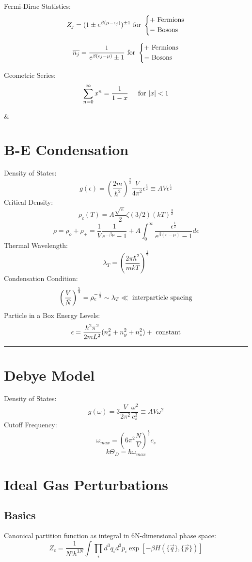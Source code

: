 \documentclass[table,cmyk]{article}
\begin{document}
\begin{longtable}
Fermi-Dirac Statistics:
\[Z_{j} = (1\pm e^{\beta(\mu - \epsilon_{j})})^{\pm1} \textmd{ for }
\begin{dcases}
	+ \textmd{ Fermions}\\
	- \textmd{ Bosons}
\end{dcases}
\]

\[ \overline{n_{j}} = \frac{1}{e^{\beta(\epsilon_{j} - \mu)} \pm 1} \textmd{ for }
\begin{dcases}
	+ \textmd{ Fermions}\\
	- \textmd{ Bosons}
\end{dcases}\]

Geometric Series:
\[\sum_{n=0}^{\infty} x^n = \frac{1}{1-x} \textmd{\hspace{0.5cm}for } |x| < 1\]

&
\section*{B-E Condensation}
Density of States:
\[g(\epsilon) = \left(\frac{2m}{\hbar^2}\right)^{\frac{2}{3}} \frac{V}{4\pi^2}\epsilon^{\frac{1}{2}} \equiv AV \epsilon^{\frac{1}{2}}\]
Critical Density:
\[\rho_{c}(T) = A \frac{\sqrt{\pi}}{2} \zeta(3/2)(kT)^{\frac{3}{2}}\]
\[\rho = \rho_{o} + \rho_{+} = \frac{1}{V} \frac{1}{e^{-\beta \mu} -1} + A \int_{0}^{\infty}\frac{\epsilon^{\frac{1}{2}}}{e^{\beta(\epsilon-\mu)}-1}d\epsilon\]
Thermal Wavelength:
\[\lambda_{T} = \left(\frac{2\pi\hbar^2}{mkT}\right)^{\frac{1}{2}}\]
Condensation Condition:
\[\left(\frac{V}{\bar{N}}\right)^{\frac{1}{3}} = \rho_{c}^{-\frac{1}{3}} \sim \lambda_{T} \ll \textmd{ interparticle spacing}\]
Particle in a Box Energy Levels:
\[\epsilon = \frac{\hbar^2\pi^2}{2mL^2}(n_{x}^2+n_{y}^2+n_{z}^2)+\textmd{ constant}\]
\noindent\rule{7.8cm}{0.4pt}
\section*{Debye Model}
Density of States:
\[g(\omega) = 3 \frac{V}{2\pi^2}\frac{\omega^2}{c_{s}^3} \equiv AV\omega^2\]
Cutoff Frequency:
\[\omega_{max} = \left(6\pi^2\frac{N}{V}\right)^{\frac{1}{3}}c_{s}\]
\[k\Theta_{D} = \hbar \omega_{max}\]

\tabularnewline\hline

\section*{Ideal Gas Perturbations}
\subsection*{Basics}
Canonical partition function as integral in 6N-dimensional phase space:
\[Z_c= \frac{1}{N!h^{3N}} \int \prod_{i} d^{3}q_i d^{3} p_i \exp[-\beta H (\{\vec{q}\},\{\vec{p}\})]\]


\end{longtable}
\end{document}
